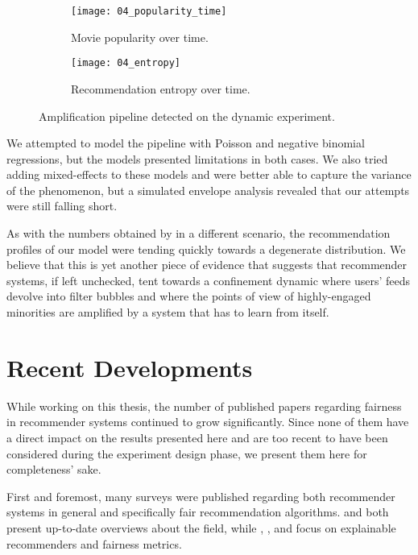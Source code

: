 \begin{figure}
  \centering
  \begin{subfigure}{0.45\textwidth}
    \centering
    \texttt{[image: 04\_popularity\_time]}
    \caption{Movie popularity over time.\label{fig:fig05_popularity_time}}
  \end{subfigure}
  \begin{subfigure}{0.45\textwidth}
    \centering
    \texttt{[image: 04\_entropy]}
    \caption{Recommendation entropy over time.\label{fig:fig05_entropy}}
  \end{subfigure}
  \caption{Amplification pipeline detected on the dynamic
  experiment.\label{fig:fig05_amplification}}
\end{figure}

We attempted to model the pipeline with Poisson and negative binomial
regressions, but the models presented limitations in both cases. We also tried
adding mixed-effects to these models and were better able to capture the
variance of the phenomenon, but a simulated envelope analysis revealed that our
attempts were still falling short.

As with the numbers obtained by \citet{jiang_degenerate_2019} in a different
scenario, the recommendation profiles of our model were tending quickly towards
a degenerate distribution. We believe that this is yet another piece of evidence
that suggests that recommender systems, if left unchecked, tent towards a
confinement dynamic where users' feeds devolve into filter bubbles and where the
points of view of highly-engaged minorities are amplified by a system that has
to learn from itself.

\section{Recent Developments}
\label{sec:developments}

While working on this thesis, the number of published papers regarding fairness
in recommender systems continued to grow significantly. Since none of them have
a direct impact on the results presented here and are too recent to have been
considered during the experiment design phase, we present them here for
completeness' sake.

First and foremost, many surveys were published regarding both recommender
systems in general and specifically fair recommendation algorithms.
\citet{afsar_reinforcement_2022} and \citet{ko_survey_2022} both present
up-to-date overviews about the field, while \citet{deldjoo_fairness_2022},
\citet{wang_survey_2023}, and \citet{li_fairness_2022} focus on explainable
recommenders and fairness metrics.

